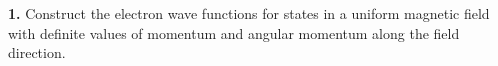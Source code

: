 \ProblemHeading\textbf{1.} Construct the electron wave functions for states in a uniform magnetic field with definite values of momentum and angular momentum along the field direction.
